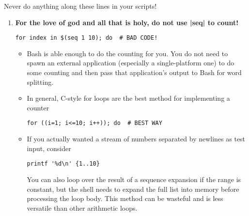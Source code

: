 \begin{frame}[fragile]{Never do anything along these lines in your scripts!}
\begin{enumerate}
\begin{lstlisting}[style=MyBash, numbers=none, aboveskip=2mm, xrightmargin=35mm]
                for line in $(<file); do  # BAD CODE!
            \end{lstlisting}
            \begin{itemize}
                \item command substitutions remove any trailing newlines!
            \end{itemize}
        \item<only@4>
            \alert{\large\textbf{For the love of god and all that is holy, do not use \bash|seq| to count!}}
            \begin{lstlisting}[style=MyBash, numbers=none, aboveskip=2mm, xrightmargin=35mm]
                for index in $(seq 1 10); do  # BAD CODE!
            \end{lstlisting}
            \begin{itemize}
                \item Bash is able enough to do the counting for you.
                      You do not need to spawn an external application (especially a single-platform one) to do some counting and then pass that application's output to Bash for word splitting.
            \end{itemize}
            \begin{itemize}
                \item In general, C-style for loops are the best method for implementing a counter
                      \begin{lstlisting}[style=MyBash, numbers=none, aboveskip=2mm, belowskip=-5mm, xrightmargin=38mm]
                          for ((i=1; i<=10; i++)); do  # BEST WAY
                      \end{lstlisting}
                \item If you actually wanted a stream of numbers separated by newlines as test input, consider
                      \begin{lstlisting}[style=MyBash, numbers=none, aboveskip=2mm, belowskip=-5mm, xrightmargin=65mm]
                          printf '%d\n' {1..10}
                      \end{lstlisting}
                      You can also loop over the result of a sequence expansion if the range is constant, but the shell needs to expand the full list into memory before processing the loop body.
                      This method can be wasteful and is less versatile than other arithmetic loops.
            \end{itemize}

\end{enumerate}
\end{frame}
